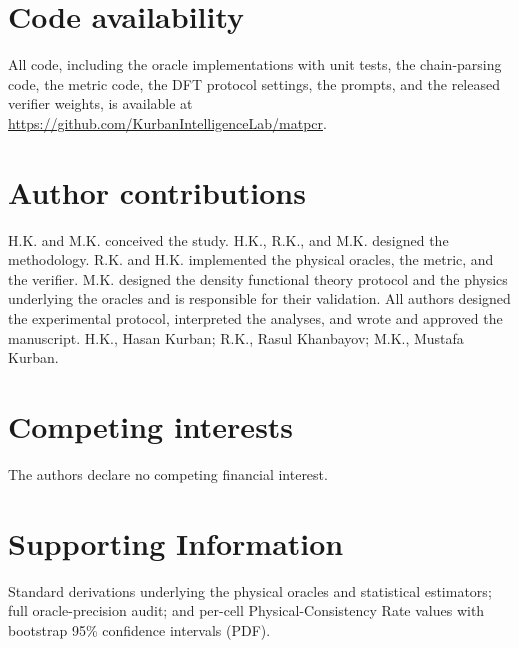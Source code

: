 \documentclass[pdflatex,sn-nature]{sn-jnl}
\begin{document}
\section*{Code availability}
All code, including the oracle implementations with unit tests, the chain-parsing
code, the metric code, the DFT protocol settings, the prompts, and the released
verifier weights, is available at \url{https://github.com/KurbanIntelligenceLab/matpcr}.

\section*{Author contributions}
H.K. and M.K. conceived the study. H.K., R.K., and M.K. designed the methodology.
R.K. and H.K. implemented the physical oracles, the metric, and the verifier. M.K.
designed the density functional theory protocol and the physics underlying the oracles
and is responsible for their validation. All authors designed the experimental protocol,
interpreted the analyses, and wrote and approved the manuscript. H.K., Hasan Kurban; R.K., Rasul
Khanbayov; M.K., Mustafa Kurban.

\section*{Competing interests}
The authors declare no competing financial interest.

\section*{Supporting Information}
Standard derivations underlying the physical oracles and statistical estimators;
full oracle-precision audit; and per-cell Physical-Consistency Rate values with
bootstrap 95\% confidence intervals (PDF).

\end{document}
